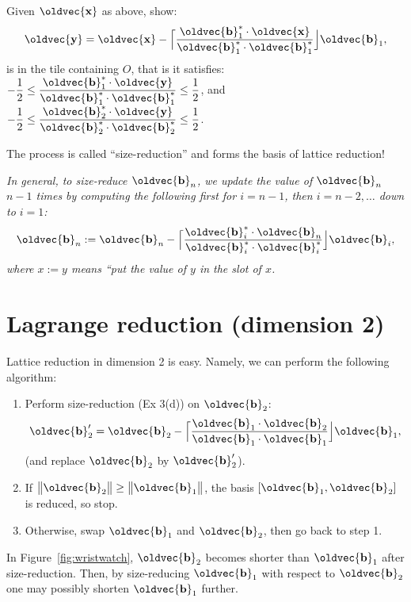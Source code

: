 \documentclass[10pt,a4paper]{article}
\renewcommand{\vec}[1]{\oldvec{\mathbf{#1}}}
\DeclarePairedDelimiter{\norm}{\big\lVert}{\big\rVert}
\begin{document}
\begin{enumerate}
		Given \(\vec{x}\) as above, show:
		\[
			\vec{y} = \vec{x} - \Big\lceil \frac{\vec{b}_1^* \cdot \vec{x}}{\vec{b}_1^* \cdot \vec{b}_1^*} \Big\rfloor \vec{b}_1,
		\]
		is in the tile containing \(O\), that is it satisfies:
		\(\displaystyle
			-\frac12 \leq \frac{\vec{b}_1^* \cdot \vec{y}}{\vec{b}_1^* \cdot \vec{b}_1^*} \leq \frac12
		\), and
		\(\displaystyle
			-\frac12 \leq \frac{\vec{b}_2^* \cdot \vec{y}}{\vec{b}_2^* \cdot \vec{b}_2^*} \leq \frac12
		\).

		The process is called ``size-reduction'' and forms the basis of lattice reduction!

		\emph{%
		In general, to size-reduce \(\vec{b}_n\), we update the value of \(\vec{b}_n\) \(n-1\) times by computing the following first for \(i = n-1\), then \(i = n-2, \ldots\) down to \(i=1\):
		\[
			\vec{b}_n := \vec{b}_n - \Big\lceil \frac{\vec{b}_i^* \cdot \vec{b}_n}{\vec{b}_i^* \cdot \vec{b}_i^*} \Big\rfloor \vec{b}_i,
		\]
		where \(x := y\) means ``put the value of \(y\) in the slot of \(x\).}
\end{enumerate}

\clearpage
\section{Lagrange reduction (dimension 2)}
Lattice reduction in dimension 2 is easy.
Namely, we can perform the following algorithm:
\begin{enumerate}[itemsep=0mm,leftmargin=4em,label=\arabic*.]
	\item Perform size-reduction (Ex 3(d)) on \(\vec{b}_2\):
	\begin{equation}\label{eq:sr-d2}
		\vec{b}_2' = \vec{b}_2 - \Big\lceil \frac{\vec{b}_1 \cdot \vec{b}_2}{\vec{b}_1 \cdot \vec{b}_1} \Big\rfloor \vec{b}_1,
	\end{equation}
	(and replace \(\vec{b}_2\) by \(\vec{b}_2'\)).
	\item If \(\norm{\vec{b}_2} \geq \norm{\vec{b}_1}\), the basis \([\vec{b}_1, \vec{b}_2]\) is reduced, so stop.
	\item Otherwise, swap \(\vec{b}_1\) and \(\vec{b}_2\), then go back to step 1. %
\end{enumerate}

In Figure~\ref{fig:wristwatch}, \(\vec{b}_2\) becomes shorter than \(\vec{b}_1\) after size-reduction.
Then, by size-reducing \(\vec{b}_1\) with respect to \(\vec{b}_2\) one may possibly shorten \(\vec{b}_1\) further.
\end{document}
